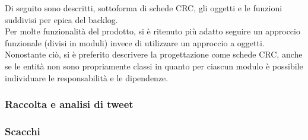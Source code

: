 Di seguito sono descritti, sottoforma di schede CRC, gli oggetti e le funzioni suddivisi per epica del backlog.\\
Per molte funzionalità del prodotto, si è ritenuto più adatto seguire un approccio funzionale (divisi in moduli) invece di utilizzare un approccio a oggetti.\\
Nonostante ciò, si è preferito descrivere la progettazione come schede CRC, anche se le entità non sono propriamente classi in quanto 
per ciascun modulo è possibile individuare le responsabilità e le dipendenze.

\subsubsection*{Raccolta e analisi di tweet}








\subsubsection*{Scacchi}

